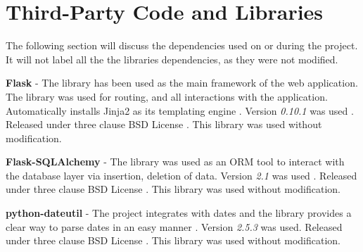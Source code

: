   \chapter{Third-Party Code and Libraries}







The following section will discuss the dependencies used on or during the project. It will not label all the the libraries dependencies, as they were not modified.

\textbf{Flask} - The library has been used as the main framework of the web application. The library was used for routing, and all interactions with the application. Automatically installs Jinja2 as its templating engine \cite{citeulike:14027420}. Version \textit{0.10.1} was used \cite{citeulike:13160396}. Released under three clause BSD License \cite{citeulike:14025861}. This library was used without modification.

\textbf{Flask-SQLAlchemy} - The library was used as an ORM tool to interact with the database layer via insertion, deletion of data. Version \textit{2.1} was used \cite{citeulike:14025864}. Released under three clause BSD License \cite{citeulike:14025861}. This library was used without modification.

\textbf{python-dateutil} - The project integrates with dates and the library provides a clear way to parse dates in an easy manner \cite{citeulike:14025869}. Version \textit{2.5.3} was used. Released under three clause BSD License \cite{citeulike:14025861}. This library was used without modification.

